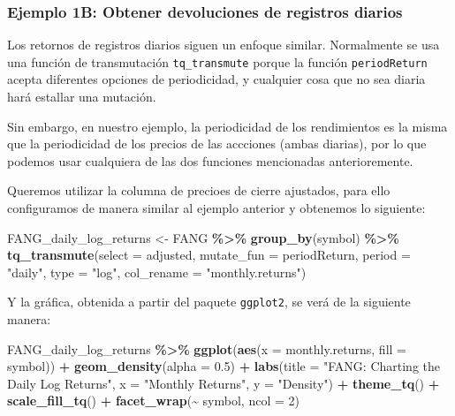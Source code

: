 \documentclass[
]{book}
\newenvironment{Shaded}{\begin{snugshade}}{\end{snugshade}}
\newcommand{\AttributeTok}[1]{\textcolor[rgb]{0.13,0.29,0.53}{#1}}
\newcommand{\DecValTok}[1]{\textcolor[rgb]{0.00,0.00,0.81}{#1}}
\newcommand{\FloatTok}[1]{\textcolor[rgb]{0.00,0.00,0.81}{#1}}
\newcommand{\FunctionTok}[1]{\textcolor[rgb]{0.13,0.29,0.53}{\textbf{#1}}}
\newcommand{\NormalTok}[1]{#1}
\newcommand{\OtherTok}[1]{\textcolor[rgb]{0.56,0.35,0.01}{#1}}
\newcommand{\SpecialCharTok}[1]{\textcolor[rgb]{0.81,0.36,0.00}{\textbf{#1}}}
\newcommand{\StringTok}[1]{\textcolor[rgb]{0.31,0.60,0.02}{#1}}
\begin{document}
\hypertarget{ejemplo-1b-obtener-devoluciones-de-registros-diarios}{%
\subsubsection{Ejemplo 1B: Obtener devoluciones de registros diarios}\label{ejemplo-1b-obtener-devoluciones-de-registros-diarios}}

Los retornos de registros diarios siguen un enfoque similar. Normalmente se usa una función de transmutación \texttt{tq\_transmute} porque la función \texttt{periodReturn} acepta diferentes opciones de periodicidad, y cualquier cosa que no sea diaria hará estallar una mutación.

Sin embargo, en nuestro ejemplo, la periodicidad de los rendimientos es la misma que la periodicidad de los precios de las accciones (ambas diarias), por lo que podemos usar cualquiera de las dos funciones mencionadas anterioremente.

Queremos utilizar la columna de precioes de cierre ajustados, para ello configuramos de manera similar al ejemplo anterior y obtenemos lo siguiente:

\begin{Shaded}
\begin{Highlighting}[]
\NormalTok{FANG\_daily\_log\_returns }\OtherTok{\textless{}{-}}\NormalTok{ FANG }\SpecialCharTok{\%\textgreater{}\%}
    \FunctionTok{group\_by}\NormalTok{(symbol) }\SpecialCharTok{\%\textgreater{}\%}
    \FunctionTok{tq\_transmute}\NormalTok{(}\AttributeTok{select     =}\NormalTok{ adjusted, }
                 \AttributeTok{mutate\_fun =}\NormalTok{ periodReturn, }
                 \AttributeTok{period     =} \StringTok{"daily"}\NormalTok{, }
                 \AttributeTok{type       =} \StringTok{"log"}\NormalTok{,}
                 \AttributeTok{col\_rename =} \StringTok{"monthly.returns"}\NormalTok{)}
\end{Highlighting}
\end{Shaded}

Y la gráfica, obtenida a partir del paquete \texttt{ggplot2}, se verá de la siguiente manera:

\begin{Shaded}
\begin{Highlighting}[]
\NormalTok{FANG\_daily\_log\_returns }\SpecialCharTok{\%\textgreater{}\%}
    \FunctionTok{ggplot}\NormalTok{(}\FunctionTok{aes}\NormalTok{(}\AttributeTok{x =}\NormalTok{ monthly.returns, }\AttributeTok{fill =}\NormalTok{ symbol)) }\SpecialCharTok{+}
    \FunctionTok{geom\_density}\NormalTok{(}\AttributeTok{alpha =} \FloatTok{0.5}\NormalTok{) }\SpecialCharTok{+}
    \FunctionTok{labs}\NormalTok{(}\AttributeTok{title =} \StringTok{"FANG: Charting the Daily Log Returns"}\NormalTok{,}
         \AttributeTok{x =} \StringTok{"Monthly Returns"}\NormalTok{, }\AttributeTok{y =} \StringTok{"Density"}\NormalTok{) }\SpecialCharTok{+}
    \FunctionTok{theme\_tq}\NormalTok{() }\SpecialCharTok{+}
    \FunctionTok{scale\_fill\_tq}\NormalTok{() }\SpecialCharTok{+} 
    \FunctionTok{facet\_wrap}\NormalTok{(}\SpecialCharTok{\textasciitilde{}}\NormalTok{ symbol, }\AttributeTok{ncol =} \DecValTok{2}\NormalTok{)}
\end{Highlighting}
\end{Shaded}
\end{document}
